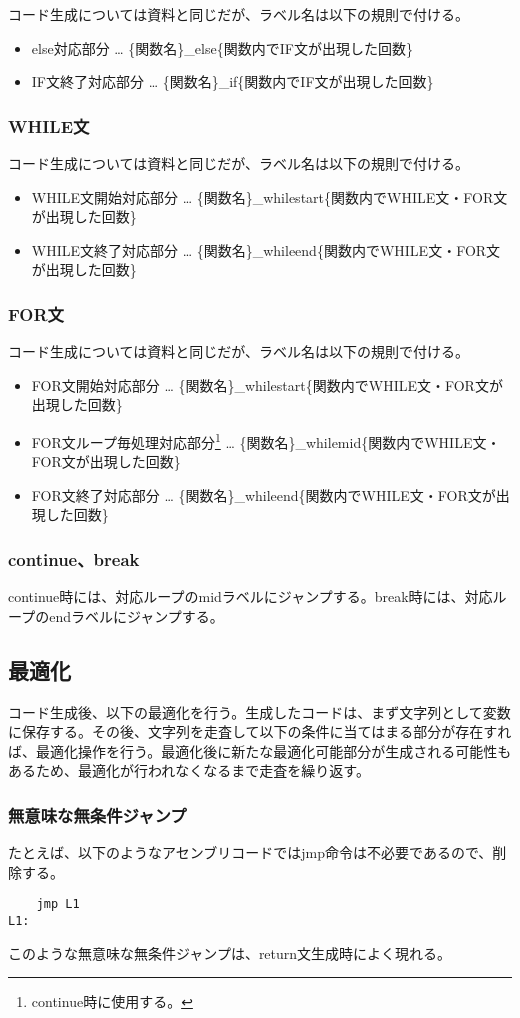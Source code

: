 \documentclass[titlepage, a4paper,12pt]{jarticle}
\begin{document}
コード生成については資料と同じだが、ラベル名は以下の規則で付ける。
\begin{itemize}
\item else対応部分 … \{関数名\}\_else\{関数内でIF文が出現した回数\}
\item IF文終了対応部分 … \{関数名\}\_if\{関数内でIF文が出現した回数\}
\end{itemize}
\subsubsection{WHILE文}
コード生成については資料と同じだが、ラベル名は以下の規則で付ける。
\begin{itemize}
\item WHILE文開始対応部分 … \{関数名\}\_whilestart\{関数内でWHILE文・FOR文が出現した回数\}
\item WHILE文終了対応部分 … \{関数名\}\_whileend\{関数内でWHILE文・FOR文が出現した回数\}
\end{itemize}
\subsubsection{FOR文}
コード生成については資料と同じだが、ラベル名は以下の規則で付ける。
\begin{itemize}
\item FOR文開始対応部分 … \{関数名\}\_whilestart\{関数内でWHILE文・FOR文が出現した回数\}
\item FOR文ループ毎処理対応部分\footnote{continue時に使用する。} … \{関数名\}\_whilemid\{関数内でWHILE文・FOR文が出現した回数\}
\item FOR文終了対応部分 … \{関数名\}\_whileend\{関数内でWHILE文・FOR文が出現した回数\}
\end{itemize}
\subsubsection{continue、break}
continue時には、対応ループのmidラベルにジャンプする。break時には、対応ループのendラベルにジャンプする。
\subsection{最適化}
コード生成後、以下の最適化を行う。生成したコードは、まず文字列として変数に保存する。その後、文字列を走査して以下の条件に当てはまる部分が存在すれば、最適化操作を行う。最適化後に新たな最適化可能部分が生成される可能性もあるため、最適化が行われなくなるまで走査を繰り返す。
\subsubsection{無意味な無条件ジャンプ}
たとえば、以下のようなアセンブリコードではjmp命令は不必要であるので、削除する。
\begin{verbatim}
    jmp L1
L1:
\end{verbatim}
このような無意味な無条件ジャンプは、return文生成時によく現れる。
\end{document}
